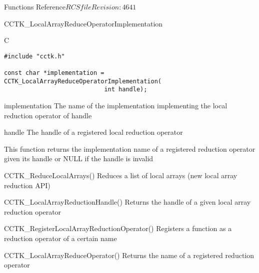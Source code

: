 \begin{cactuspart}{ Functions Reference}{$RCSfile$}{$Revision: 4641 $}
\begin{FunctionDescription}{CCTK\_LocalArrayReduceOperatorImplementation}
\begin{SynopsisSection}
\begin{Synopsis}{C}
\begin{verbatim}
#include "cctk.h"

const char *implementation = CCTK_LocalArrayReduceOperatorImplementation(
                            int handle);
\end{verbatim}
\end{Synopsis}
\end{SynopsisSection}

\begin{ResultSection}
\begin{Result}{implementation}
The name of the implementation implementing the local reduction operator of handle \newline {}
\end{Result}
\end{ResultSection}

\begin{ParameterSection}
\begin{Parameter}{handle}
The handle of a registered local reduction operator
\end{Parameter}
\end{ParameterSection}

\begin{Discussion}
This function returns the implementation name of a registered reduction operator given
its handle or NULL if the handle is invalid
\end{Discussion}

\begin{SeeAlsoSection}
\begin{SeeAlso}{CCTK\_ReduceLocalArrays()}
Reduces a list of local arrays (new local array reduction API)
\end{SeeAlso}

\begin{SeeAlso}{CCTK\_LocalArrayReductionHandle()}
Returns the handle of a given local array reduction operator
\end{SeeAlso}

\begin{SeeAlso}{CCTK\_RegisterLocalArrayReductionOperator()}
Registers a function as a reduction operator of a certain name
\end{SeeAlso}
\begin{SeeAlso}{CCTK\_LocalArrayReduceOperator()}
Returns the name of a registered reduction operator
\end{SeeAlso}


\end{SeeAlsoSection}
\end{FunctionDescription}
\end{cactuspart}
